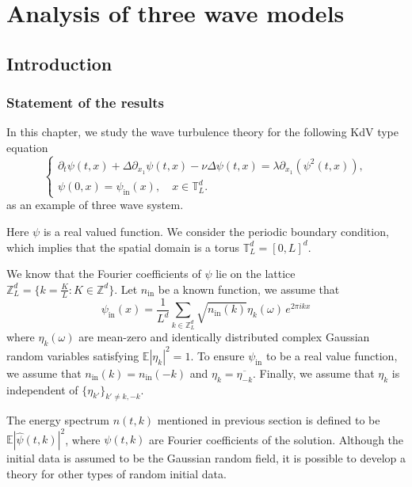 \chapter{Analysis of three wave models}

\section{Introduction}

\subsection{Statement of the results}
In this chapter, we study the wave turbulence theory for the following KdV type equation
\begin{equation}\tag{MKDV}\label{eq.MKDV}
\begin{cases}
\partial_t\psi(t,x)+\Delta\partial_{x_1}\psi(t,x)-\nu \Delta \psi(t,x)=\lambda \partial_{x_1}(\psi^2(t,x)),\\[.6em]
\psi(0,x) = \psi_{\textrm{in}}(x), \quad x\in \mathbb{T}^d_{L}.
\end{cases}    
\end{equation}
as an example of three wave system.

Here $\psi$ is a real valued function. We consider the periodic boundary condition, which implies that the spatial domain is a torus $\mathbb{T}^d_{L}=[0,L]^d$. 

We know that the Fourier coefficients of $\psi$ lie on the lattice $\mathbb{Z}_L^d = \{k=\frac{K}{L}:K\in \mathbb{Z}^d\}$. Let $n_{\textrm{in}}$ be a known function, we assume that
\begin{equation}\label{eq.wellprepared}
\psi_{\textrm{in}}(x)=\frac{1}{L^d}\sum_{k\in\mathbb{Z}^d_L}\sqrt{n_{\textrm{in}}(k)} \eta_k(\omega)\,  e^{2\pi i kx}
\end{equation}
where $\eta_k(\omega)$ are mean-zero and identically distributed complex Gaussian random variables satisfying $\mathbb E |\eta_k|^2=1$. To ensure $\psi_{\textrm{in}}$ to be a real value function, we assume that $n_{\textrm{in}}(k)=n_{\textrm{in}}(-k)$ and $\eta_k=\overline{\eta_{-k}}$. Finally, we assume that $\eta_k$ is independent of $\{\eta_{k'}\}_{k'\ne k,-k}$.


The energy spectrum $n(t,k)$ mentioned in previous section is defined to be $\mathbb E |\widehat \psi(t, k)|^2$, where $\psi(t, k)$ are Fourier coefficients of the solution. Although the initial data is assumed to be the Gaussian random field, it is possible to develop a theory for other types of random initial data.


